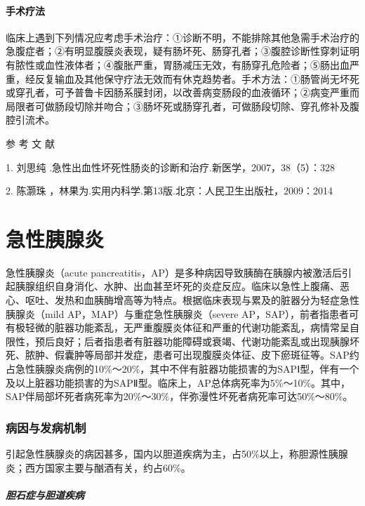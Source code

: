 \subsubsection{手术疗法}

临床上遇到下列情况应考虑手术治疗：①诊断不明，不能排除其他急需手术治疗的急腹症者；②有明显腹膜炎表现，疑有肠坏死、肠穿孔者；③腹腔诊断性穿刺证明有脓性或血性液体者；④腹胀严重，胃肠减压无效，有肠穿孔危险者；⑤肠出血严重，经反复输血及其他保守疗法无效而有休克趋势者。手术方法：①肠管尚无坏死或穿孔者，可予普鲁卡因肠系膜封闭，以改善病变肠段的血液循环；②病变严重而局限者可做肠段切除并吻合；③肠坏死或肠穿孔者，可做肠段切除、穿孔修补及腹腔引流术。\protect\hypertarget{text00325.html}{}{}

\hypertarget{text00325.htmlux5cux23CHP11-5-4}{}
参 考 文 献

1. 刘思纯 .急性出血性坏死性肠炎的诊断和治疗.新医学，2007，38（5）：328

2. 陈灏珠 ，林果为.实用内科学.第13版.北京：人民卫生出版社，2009：2014

\protect\hypertarget{text00326.html}{}{}

\chapter{急性胰腺炎}

急性胰腺炎（acute
pancreatitis，AP）是多种病因导致胰酶在胰腺内被激活后引起胰腺组织自身消化、水肿、出血甚至坏死的炎症反应。临床以急性上腹痛、恶心、呕吐、发热和血胰酶增高等为特点。根据临床表现与累及的脏器分为轻症急性胰腺炎（mild
AP，MAP）与重症急性胰腺炎（severe
AP，SAP），前者指患者可有极轻微的脏器功能紊乱，无严重腹膜炎体征和严重的代谢功能紊乱，病情常呈自限性，预后良好；后者指患者有脏器功能障碍或衰竭、代谢功能紊乱或出现胰腺坏死、脓肿、假囊肿等局部并发症，患者可出现腹膜炎体征、皮下瘀斑征等。SAP约占急性胰腺炎病例的10\%～20\%，其中不伴有脏器功能损害的为SAPⅠ型，伴有一个及以上脏器功能损害的为SAPⅡ型。临床上，AP总体病死率为5\%～10\%。其中，SAP伴局部坏死者病死率为20\%～30\%，伴弥漫性坏死者病死率可达50\%～80\%。

\subsection{病因与发病机制}

引起急性胰腺炎的病因甚多，国内以胆道疾病为主，占50\%以上，称胆源性胰腺炎；西方国家主要与酗酒有关，约占60\%。

\paragraph{胆石症与胆道疾病}

